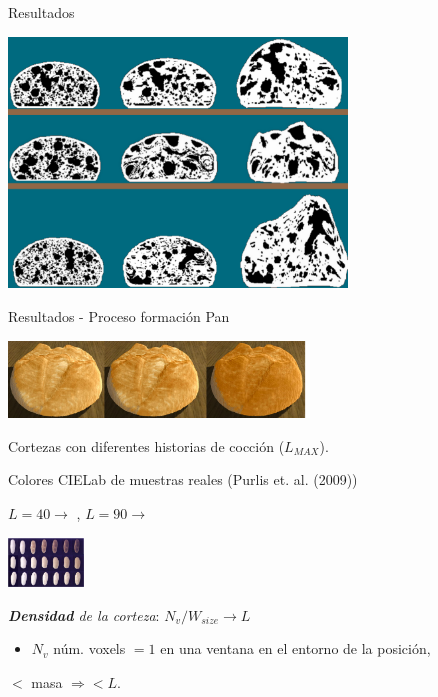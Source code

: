 \documentclass[spanish,unknownkeysallowed,10pt]{beamer}
\begin{document}
\begin{frame}{Resultados}

\centerline{\includegraphics[width=9cm]{../figures/Fig9}}

\end{frame}

\begin{frame}{Resultados - Proceso formación Pan}

\centerline{\includegraphics[width=8cm]{../figures/Fig13}}
Cortezas con diferentes historias de cocción ($L_{MAX}$).

Colores CIELab de muestras reales (Purlis et. al. (2009))

$L = 40 \rightarrow$ , $L = 90 \rightarrow$ 

\centerline{\includegraphics[width=2cm]{../figures/browning}}

{\em \textbf{Densidad} de la corteza}: $N_{v} / W_{size} \rightarrow L$

\begin{itemize}
\item $N_{v}$ núm. voxels $= 1$ en una ventana en el entorno de la posición,
\end{itemize}

$<$ masa $\Rightarrow < L$.

\end{frame}
\end{document}
